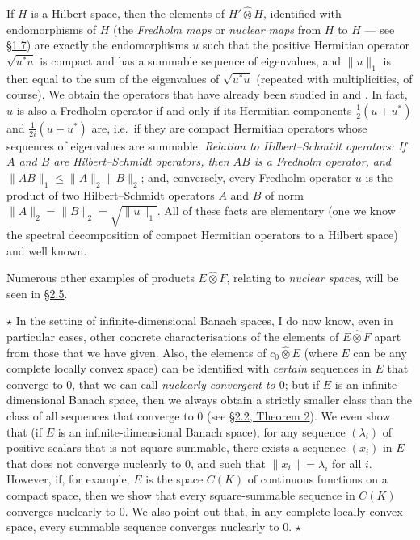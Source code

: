 \documentclass[british]{article}
\newcommand{\oldpage}[1]{\marginpar{\footnotesize$\Big\vert$ \textit{p.~#1}}}
\begin{document}
If \(H\) is a Hilbert space, then the elements of \(H'\hat{\otimes}H\),
identified with endomorphisms of \(H\) (the \emph{Fredholm maps} or
\emph{nuclear maps} from \(H\) to \(H\) --- see
\hyperref[section-1.7]{§1.7}) are exactly the endomorphisms \(u\) such
that the positive Hermitian operator \(\sqrt{u^*u}\) is compact and has
a summable sequence of eigenvalues, and \(\|u\|_1\) is then equal to the
sum of the eigenvalues of \(\sqrt{u^*u}\) (repeated with multiplicities,
of course). \oldpage{81} We obtain the operators that have already been
studied in \autocite{4} and \autocite{8}. In fact, \(u\) is also a
Fredholm operator if and only if its Hermitian components
\(\frac12(u+u^*)\) and \(\frac{1}{2i}(u-u^*)\) are, i.e.~if they are
compact Hermitian operators whose sequences of eigenvalues are summable.
\emph{Relation to Hilbert--Schmidt operators: If \(A\) and \(B\) are
Hilbert--Schmidt operators, then \(AB\) is a Fredholm operator, and
\(\|AB\|_1\leqslant\|A\|_2\|B\|_2\)}; and, conversely, every Fredholm
operator \(u\) is the product of two Hilbert--Schmidt operators \(A\)
and \(B\) of norm \(\|A\|_2=\|B\|_2=\sqrt{\|u\|_1}\). All of these facts
are elementary (one we know the spectral decomposition of compact
Hermitian operators to a Hilbert space) and well known.

Numerous other examples of products \(E\hat{\otimes}F\), relating to
\emph{nuclear spaces}, will be seen in \hyperref[section-2.5]{§2.5}.

\(\star\) In the setting of infinite-dimensional Banach spaces, I do now
know, even in particular cases, other concrete characterisations of the
elements of \(E\hat{\otimes}F\) apart from those that we have given.
Also, the elements of \(c_0\hat{\otimes}E\) (where \(E\) can be any
complete locally convex space) can be identified with \emph{certain}
sequences in \(E\) that converge to \(0\), that we can call
\emph{nuclearly convergent to \(0\)}; but if \(E\) is an
infinite-dimensional Banach space, then we always obtain a strictly
smaller class than the class of all sequences that converge to \(0\)
(see \hyperref[section-2-theorem-2]{§2.2, Theorem 2}). We even show that
(if \(E\) is an infinite-dimensional Banach space), for any sequence
\((\lambda_i)\) of positive scalars that is not square-summable, there
exists a sequence \((x_i)\) in \(E\) that does not converge nuclearly to
\(0\), and such that \(\|x_i\|=\lambda_i\) for all \(i\). However, if,
for example, \(E\) is the space \(C(K)\) of continuous functions on a
compact space, then we show that every square-summable sequence in
\(C(K)\) converges nuclearly to \(0\). We also point out that, in any
complete locally convex space, every summable sequence converges
nuclearly to \(0\). \(\star\)
\end{document}
